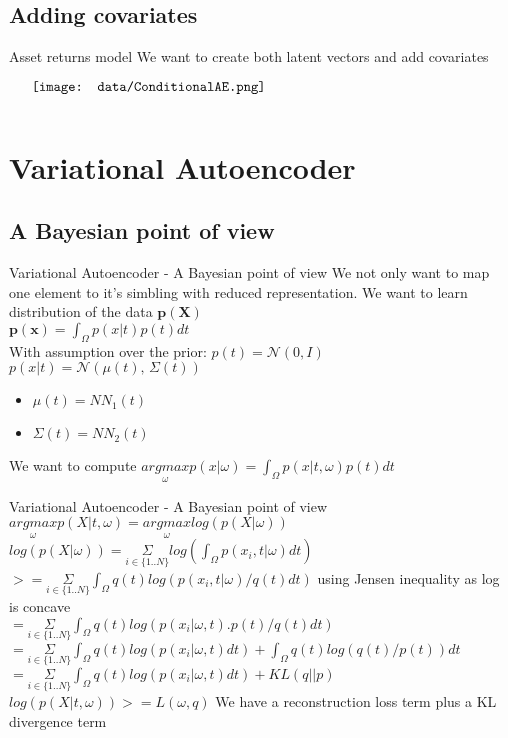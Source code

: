 \documentclass{beamer}
\begin{document}
\subsection{Adding covariates}
\begin{frame}{Asset returns model}
    We want to create both latent vectors and add covariates
    \begin{minipage}{5in}
    \centering
    $\vcenter{
    \texttt{[image: data/ConditionalAE.png]} \\
    }$
    \end{minipage}
\end{frame}

\section{Variational Autoencoder}
\subsection{A Bayesian point of view}
\begin{frame}{Variational Autoencoder - A Bayesian point of view}
    We not only want to map one element to it's simbling with reduced representation.
    We want to learn distribution of the data $\mathbf{p(X)}$ \\
    $ \mathbf{p(x)} = \int_\Omega p(x|t)p(t) dt$  \\
	With assumption over the prior: $p(t) = \mathcal{N}(0, I)$ \\
	$ p(x| t) = \mathcal{N}(\mu(t),\,\Sigma(t))$ \\
	\begin{itemize}
		\item $ \mu(t) = NN_1(t)$
		\item $ \Sigma(t) = NN_2(t)$
	\end{itemize}
	We want to compute $\underset{\omega}{argmax} p(x| \omega) = \int_\Omega p(x|t, \omega)p(t) dt$  \\
\end{frame}

\begin{frame}{Variational Autoencoder - A Bayesian point of view}
	$\underset{\omega}{argmax} p(X|t, \omega) = \underset{\omega}{argmax} log(p(X| \omega))$ \\
	$ log(p(X| \omega)) = \underset{i \in \{1..N\}}{\Sigma} log( \int_\Omega p(x_i, t | \omega) dt)$ \\ 
	$ >= \underset{i \in \{1..N\}}{\Sigma} \int_\Omega q(t) log( p(x_i, t | \omega)/q(t) dt)$ using Jensen inequality as log is concave\\
	$ = \underset{i \in \{1..N\}}{\Sigma} \int_\Omega q(t) log( p(x_i | \omega, t).p(t)/q(t) dt)$ \\
	$ = \underset{i \in \{1..N\}}{\Sigma} \int_\Omega q(t) log( p(x_i | \omega, t) dt) + \int_\Omega q(t)log(q(t)/p(t)) dt$ \\
	$ = \underset{i \in \{1..N\}}{\Sigma} \int_\Omega q(t) log( p(x_i | \omega, t) dt) + KL( q || p) $ \\
	$ log(p(X|t, \omega)) >= L(\omega,q) $
	We have a reconstruction loss term plus a KL divergence term
\end{frame}
\end{document}
